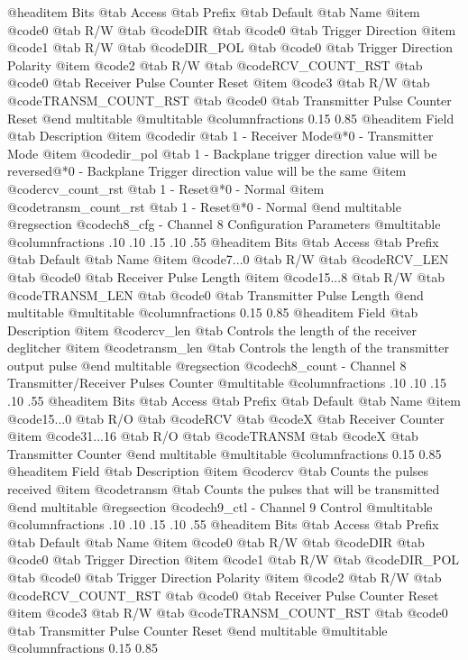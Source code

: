 @headitem Bits @tab Access @tab Prefix @tab Default @tab Name
@item @code{0}
@tab R/W @tab
@code{DIR}
@tab @code{0} @tab 
Trigger Direction
@item @code{1}
@tab R/W @tab
@code{DIR_POL}
@tab @code{0} @tab 
Trigger Direction Polarity
@item @code{2}
@tab R/W @tab
@code{RCV_COUNT_RST}
@tab @code{0} @tab 
Receiver Pulse Counter Reset
@item @code{3}
@tab R/W @tab
@code{TRANSM_COUNT_RST}
@tab @code{0} @tab 
Transmitter Pulse Counter Reset
@end multitable
@multitable @columnfractions 0.15 0.85
@headitem Field @tab Description
@item @code{dir} @tab 1 - Receiver Mode@*0 - Transmitter Mode
@item @code{dir_pol} @tab 1 - Backplane trigger direction value will be reversed@*0 - Backplane Trigger direction value will be the same
@item @code{rcv_count_rst} @tab 1 - Reset@*0 - Normal
@item @code{transm_count_rst} @tab 1 - Reset@*0 - Normal
@end multitable
@regsection @code{ch8_cfg} - Channel 8 Configuration Parameters
@multitable @columnfractions .10 .10 .15 .10 .55
@headitem Bits @tab Access @tab Prefix @tab Default @tab Name
@item @code{7...0}
@tab R/W @tab
@code{RCV_LEN}
@tab @code{0} @tab 
Receiver Pulse Length
@item @code{15...8}
@tab R/W @tab
@code{TRANSM_LEN}
@tab @code{0} @tab 
Transmitter Pulse Length
@end multitable
@multitable @columnfractions 0.15 0.85
@headitem Field @tab Description
@item @code{rcv_len} @tab Controls the length of the receiver deglitcher
@item @code{transm_len} @tab Controls the length of the transmitter output pulse
@end multitable
@regsection @code{ch8_count} - Channel 8 Transmitter/Receiver Pulses Counter
@multitable @columnfractions .10 .10 .15 .10 .55
@headitem Bits @tab Access @tab Prefix @tab Default @tab Name
@item @code{15...0}
@tab R/O @tab
@code{RCV}
@tab @code{X} @tab 
Receiver Counter
@item @code{31...16}
@tab R/O @tab
@code{TRANSM}
@tab @code{X} @tab 
Transmitter Counter
@end multitable
@multitable @columnfractions 0.15 0.85
@headitem Field @tab Description
@item @code{rcv} @tab Counts the pulses received
@item @code{transm} @tab Counts the pulses that will be transmitted
@end multitable
@regsection @code{ch9_ctl} - Channel 9 Control
@multitable @columnfractions .10 .10 .15 .10 .55
@headitem Bits @tab Access @tab Prefix @tab Default @tab Name
@item @code{0}
@tab R/W @tab
@code{DIR}
@tab @code{0} @tab 
Trigger Direction
@item @code{1}
@tab R/W @tab
@code{DIR_POL}
@tab @code{0} @tab 
Trigger Direction Polarity
@item @code{2}
@tab R/W @tab
@code{RCV_COUNT_RST}
@tab @code{0} @tab 
Receiver Pulse Counter Reset
@item @code{3}
@tab R/W @tab
@code{TRANSM_COUNT_RST}
@tab @code{0} @tab 
Transmitter Pulse Counter Reset
@end multitable
@multitable @columnfractions 0.15 0.85
